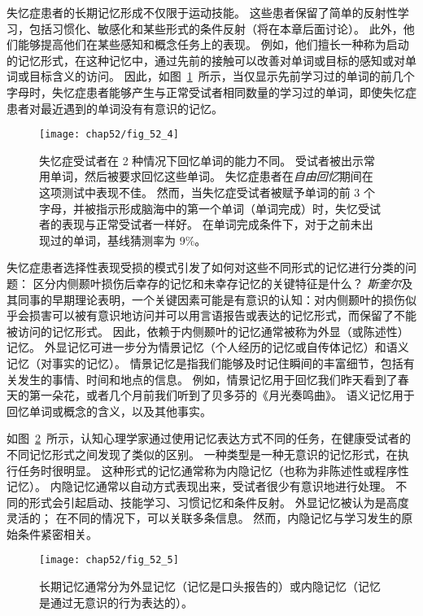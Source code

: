 失忆症患者的长期记忆形成不仅限于运动技能。
这些患者保留了简单的反射性学习，包括习惯化、敏感化和某些形式的条件反射（将在本章后面讨论）。
此外，他们能够提高他们在某些感知和概念任务上的表现。
例如，他们擅长一种称为启动的记忆形式，在这种记忆中，通过先前的接触可以改善对单词或目标的感知或对单词或目标含义的访问。
因此，如图~\ref{fig:52_4}~所示，当仅显示先前学习过的单词的前几个字母时，失忆症患者能够产生与正常受试者相同数量的学习过的单词，即使失忆症患者对最近遇到的单词没有有意识的记忆。


\begin{figure}[htbp]
	\centering
	\texttt{[image: chap52/fig\_52\_4]}
	\caption{失忆症受试者在 2 种情况下回忆单词的能力不同。
		受试者被出示常用单词，然后被要求回忆这些单词。
		失忆症患者在\textit{自由回忆}期间在这项测试中表现不佳。
		然而，当失忆症受试者被赋予单词的前 3 个字母，并被指示形成脑海中的第一个单词（单词完成）时，失忆受试者的表现与正常受试者一样好。
		在单词完成条件下，对于之前未出现过的单词，基线猜测率为 9\%\cite{squire1987memory}。}
	\label{fig:52_4}
\end{figure}


失忆症患者选择性表现受损的模式引发了如何对这些不同形式的记忆进行分类的问题：
区分内侧颞叶损伤后幸存的记忆和未幸存记忆的关键特征是什么？
\textit{斯奎尔}及其同事的早期理论表明，一个关键因素可能是有意识的认知：对内侧颞叶的损伤似乎会损害可以被有意识地访问并可以用言语报告或表达的记忆形式，而保留了不能被访问的记忆形式。
因此，依赖于内侧颞叶的记忆通常被称为外显（或陈述性）记忆。
外显记忆可进一步分为情景记忆（个人经历的记忆或自传体记忆）和语义记忆（对事实的记忆）。
情景记忆是指我们能够及时记住瞬间的丰富细节，包括有关发生的事情、时间和地点的信息。
例如，情景记忆用于回忆我们昨天看到了春天的第一朵花，或者几个月前我们听到了贝多芬的《月光奏鸣曲》。
语义记忆用于回忆单词或概念的含义，以及其他事实。


如图~\ref{fig:52_5}~所示，认知心理学家通过使用记忆表达方式不同的任务，在健康受试者的不同记忆形式之间发现了类似的区别。
一种类型是一种无意识的记忆形式，在执行任务时很明显。
这种形式的记忆通常称为内隐记忆（也称为非陈述性或程序性记忆）。
内隐记忆通常以自动方式表现出来，受试者很少有意识地进行处理。
不同的形式会引起启动、技能学习、习惯记忆和条件反射。
外显记忆被认为是高度灵活的；
在不同的情况下，可以关联多条信息。
然而，内隐记忆与学习发生的原始条件紧密相关。


\begin{figure}[htbp]
	\centering
	\texttt{[image: chap52/fig\_52\_5]}
	\caption{长期记忆通常分为外显记忆（记忆是口头报告的）或内隐记忆（记忆是通过无意识的行为表达的）。}
	\label{fig:52_5}
\end{figure}


